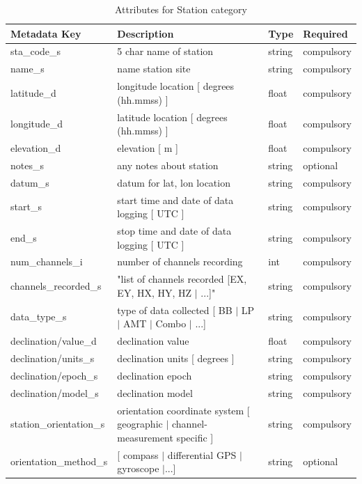 \documentclass{article}
\begin{document}
\begin{table}[htb!]
	\caption[Attributes for Station]{Attributes for Station category}
	\begin{tabular}{|l|p{3in}|l|l|}
		\hline
		\textbf{Metadata Key} & \textbf{Description} & \textbf{Type} & \textbf{Required} \\ \hline
		sta\_code\_s & 5 char name of station & string & compulsory \\ \hline
		name\_s & name station site & string & compulsory \\ \hline
		latitude\_d & longitude location [ degrees (hh.mmss) ] & float & compulsory \\ \hline
		longitude\_d & latitude location [ degrees (hh.mmss) ] & float & compulsory \\ \hline
		elevation\_d & elevation [ m ] & float & compulsory \\ \hline
		notes\_s & any notes about station & string & optional \\ \hline
		datum\_s & datum for lat, lon location & string & compulsory \\ \hline
		start\_s & start time and date of data logging [ UTC ] & string & compulsory \\ \hline
		end\_s & stop time and date of data logging  [ UTC ] & string & compulsory \\ \hline
		num\_channels\_i & number of channels recording & int & compulsory \\ \hline
		channels\_recorded\_s & "list of channels recorded [EX, EY, HX, HY, HZ $|$ ...]" & string & compulsory \\ \hline
		data\_type\_s & type of data collected [ BB $|$ LP $|$ AMT $|$ Combo $|$ ...] & string & compulsory \\ \hline
		declination/value\_d & declination value & float & compulsory \\ \hline
		declination/units\_s & declination units [ degrees ] & string & compulsory \\ \hline
		declination/epoch\_s & declination epoch & string & compulsory \\ \hline
		declination/model\_s & declination model & string & compulsory \\ \hline
		station\_orientation\_s & orientation coordinate system [ geographic $|$ channel-measurement specific ] & string & compulsory \\ \hline
		orientation\_method\_s & [ compass $|$ differential GPS $|$ gyroscope $|$...] & string & optional \\ \hline

\end{tabular}
\end{table}
\end{document}
